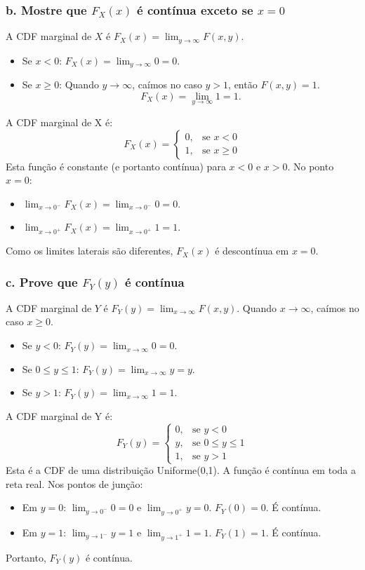 \documentclass[12pt]{article}
\begin{document}
\subsubsection*{b. Mostre que $F_X(x)$ é contínua exceto se $x=0$}
A CDF marginal de $X$ é $F_X(x) = \lim_{y\to\infty} F(x,y)$.
\begin{itemize}
    \item Se $x < 0$: $F_X(x) = \lim_{y\to\infty} 0 = 0$.
    \item Se $x \ge 0$: Quando $y\to\infty$, caímos no caso $y>1$, então $F(x,y)=1$.
    \[ F_X(x) = \lim_{y\to\infty} 1 = 1. \]
\end{itemize}
A CDF marginal de X é:
\[ F_X(x) = \begin{cases} 0, & \text{se } x < 0 \\ 1, & \text{se } x \ge 0 \end{cases} \]
Esta função é constante (e portanto contínua) para $x < 0$ e $x > 0$. No ponto $x=0$:
\begin{itemize}
    \item $\lim_{x\to 0^-} F_X(x) = \lim_{x\to 0^-} 0 = 0$.
    \item $\lim_{x\to 0^+} F_X(x) = \lim_{x\to 0^+} 1 = 1$.
\end{itemize}
Como os limites laterais são diferentes, $F_X(x)$ é descontínua em $x=0$.

\subsubsection*{c. Prove que $F_Y(y)$ é contínua}
A CDF marginal de $Y$ é $F_Y(y) = \lim_{x\to\infty} F(x,y)$.
Quando $x\to\infty$, caímos no caso $x \ge 0$.
\begin{itemize}
    \item Se $y < 0$: $F_Y(y) = \lim_{x\to\infty} 0 = 0$.
    \item Se $0 \le y \le 1$: $F_Y(y) = \lim_{x\to\infty} y = y$.
    \item Se $y > 1$: $F_Y(y) = \lim_{x\to\infty} 1 = 1$.
\end{itemize}
A CDF marginal de Y é:
\[ F_Y(y) = \begin{cases} 0, & \text{se } y < 0 \\ y, & \text{se } 0 \le y \le 1 \\ 1, & \text{se } y > 1 \end{cases} \]
Esta é a CDF de uma distribuição Uniforme(0,1). A função é contínua em toda a reta real. Nos pontos de junção:
\begin{itemize}
    \item Em $y=0$: $\lim_{y\to 0^-} 0 = 0$ e $\lim_{y\to 0^+} y = 0$. $F_Y(0)=0$. É contínua.
    \item Em $y=1$: $\lim_{y\to 1^-} y = 1$ e $\lim_{y\to 1^+} 1 = 1$. $F_Y(1)=1$. É contínua.
\end{itemize}
Portanto, $F_Y(y)$ é contínua.
\end{document}
